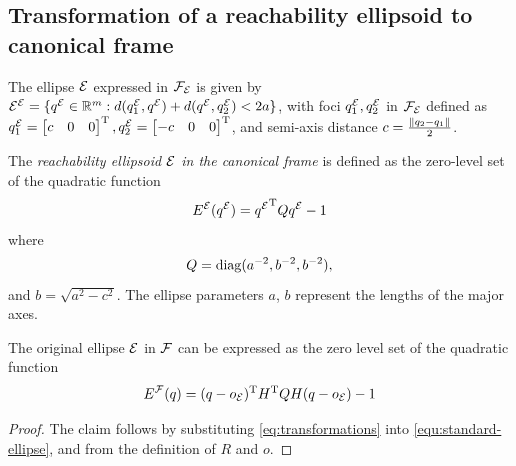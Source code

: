 \documentclass[10pt,twocolumn,twoside]{IEEEtran}
\newcommand{\news}{\color{blue}}
\begin{document}
\appendix
{\news
\subsection{Transformation of a reachability ellipsoid to canonical frame}\label{apx:transformation}
The ellipse $\mathcal{E}$ expressed in $\mathcal{F}_{\mathcal{E}}$ is given by ${\mathcal{E}^{\mathcal{E}}}=\{{q^{\mathcal{E}}}\in\mathbb{R}^{m}{}:d(q^{\mathcal{E}}_1,{q^{\mathcal{E}}})+d({q^{\mathcal{E}}},q^{\mathcal{E}}_2)<2a\}$, with foci $q^{\mathcal{E}}_1,q^{\mathcal{E}}_2$ in $\mathcal{F}_{\mathcal{E}}$ defined as
$q^{\mathcal{E}}_1=\begin{bmatrix}c & 0 & 0\end{bmatrix}^\mathrm{T}, q^{\mathcal{E}}_2=\begin{bmatrix}-c & 0 & 0\end{bmatrix}^\mathrm{T}$, and semi-axis distance $c=\frac{\lVert q_2-q_1\rVert}{2}$.
\begin{definition}
  The \emph{reachability ellipsoid $\mathcal{E}$ in the canonical frame} is defined as the zero-level set of the quadratic function
  \begin{equation}\label{equ:standard-ellipse}
    {E^{\mathcal{E}}}({q^{\mathcal{E}}}) = {q^{\mathcal{E}}}^\mathrm{T} Q {q^{\mathcal{E}}} - 1
  \end{equation}
  where
  \begin{equation}
    Q = \operatorname{diag}(a^{-2},b^{-2},b^{-2}),
  \end{equation}
  and $b = \sqrt{a^2-c^2}$.
  The ellipse parameters $a$, $b$ represent the lengths of the major axes.
\end{definition}
\begin{lemma}
The original ellipse $\mathcal{E}$ in $\mathcal{F}$ can be expressed as the zero level set of the quadratic function
   \begin{equation}\label{eq:ellpsoid from canonical}
     {E^{\mathcal{F}}}(q) = (q-o_{\mathcal{E}})^\mathrm{T} H^\mathrm{T} Q H (q-o_{\mathcal{E}}) - 1
     \end{equation}
\end{lemma}
\begin{proof}
    The claim follows by substituting  \eqref{eq:transformations} into \eqref{equ:standard-ellipse}, and from the definition of $R$ and $o$.
\end{proof}
}
\end{document}
